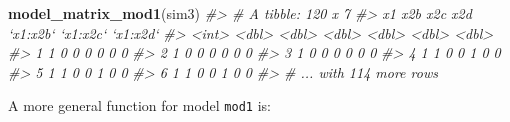 \documentclass[]{book}
\newenvironment{Shaded}{\begin{snugshade}}{\end{snugshade}}
\newcommand{\CommentTok}[1]{\textcolor[rgb]{0.56,0.35,0.01}{\textit{#1}}}
\newcommand{\ControlFlowTok}[1]{\textcolor[rgb]{0.13,0.29,0.53}{\textbf{#1}}}
\newcommand{\DataTypeTok}[1]{\textcolor[rgb]{0.13,0.29,0.53}{#1}}
\newcommand{\KeywordTok}[1]{\textcolor[rgb]{0.13,0.29,0.53}{\textbf{#1}}}
\newcommand{\NormalTok}[1]{#1}
\newcommand{\OperatorTok}[1]{\textcolor[rgb]{0.81,0.36,0.00}{\textbf{#1}}}
\newcommand{\StringTok}[1]{\textcolor[rgb]{0.31,0.60,0.02}{#1}}
\theoremstyle{plain}
\theoremstyle{remark}
\theoremstyle{definition}
\theoremstyle{definition}
\theoremstyle{definition}
\theoremstyle{remark}
\begin{document}
\begin{Shaded}
\begin{Highlighting}[]
\KeywordTok{model_matrix_mod1}\NormalTok{(sim3)}
\CommentTok{#> # A tibble: 120 x 7}
\CommentTok{#>      x1   x2b   x2c   x2d `x1:x2b` `x1:x2c` `x1:x2d`}
\CommentTok{#>   <int> <dbl> <dbl> <dbl>    <dbl>    <dbl>    <dbl>}
\CommentTok{#> 1     1     0     0     0        0        0        0}
\CommentTok{#> 2     1     0     0     0        0        0        0}
\CommentTok{#> 3     1     0     0     0        0        0        0}
\CommentTok{#> 4     1     1     0     0        1        0        0}
\CommentTok{#> 5     1     1     0     0        1        0        0}
\CommentTok{#> 6     1     1     0     0        1        0        0}
\CommentTok{#> # ... with 114 more rows}
\end{Highlighting}
\end{Shaded}

\begin{Shaded}
\end{Shaded}

A more general function for model \texttt{mod1} is:
\end{document}
